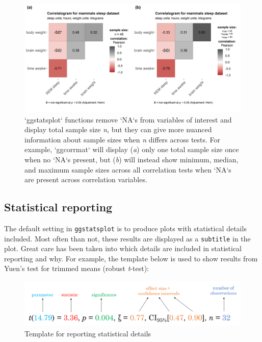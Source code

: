 \documentclass[
]{article}
\begin{document}
\begin{figure}[H]
\includegraphics[width=1\linewidth]{./figures/paper-fig4-1} \caption{`ggstatsplot` functions remove `NA`s from variables of interest and display total sample size \textit{n}, but they can give more nuanced information about sample sizes when \textit{n} differs across tests. For example, `ggcorrmat` will display (\textit{a}) only one total sample size once when no `NA`s present, but (\textit{b}) will instead show minimum, median, and maximum sample sizes across all correlation tests when `NA`s are present across correlation variables.}\label{fig:fig4}
\end{figure}

\hypertarget{statistical-reporting}{%
\subsection{Statistical reporting}\label{statistical-reporting}}

The default setting in \texttt{ggstatsplot} is to produce plots with statistical
details included. Most often than not, these results are displayed as a \texttt{subtitle}
in the plot. Great care has been taken into which details are included in
statistical reporting and why. For example, the template below is used to show
results from Yuen's test for trimmed means (robust \emph{t}-test):

\begin{figure}
\centering
\includegraphics{figures/stats_reporting_format.png}
\caption{Template for reporting statistical details}
\end{figure}
\end{document}
